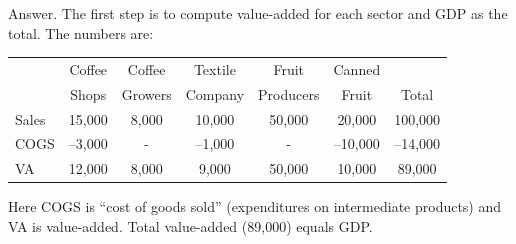 \documentclass[letterpaper,12pt]{article}
\newcommand{\phm}{\phantom{--}}
\begin{document}
\begin{enumerate}
Answer.  The first step is to compute value-added for each sector
and GDP as the total.  The numbers are:
\begin{center}
\begin{tabular}{lcccccc}
\hline\hline%
            &  Coffee     & Coffee  &  Textile  &   Fruit   & Canned  \\
            &   Shops     & Growers & Company & Producers & Fruit & Total\\%

\hline\hline%
Sales   &   15,000   & 8,000   & 10,000 & 50,000 & 20,000 
                                                & 100,000\phantom{1} \\%
COGS    &   --3,000  & -    & --1,000   &   -    & --10,000\phm & --14,000\phm \\%
VA          &  12,000     & 8,000     & \phantom{1}9,000  
            & 50,000 & 10,000     & 89,000\\%
\hline\hline%
\end{tabular}
\end{center}
Here COGS is ``cost of goods sold'' (expenditures on intermediate
products) and VA is value-added.  Total value-added (89,000) equals
GDP.


\end{enumerate}
\end{document}
